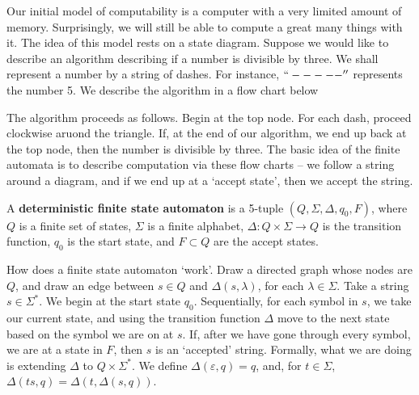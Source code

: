 Our initial model of computability is a computer with a very limited amount of memory. Surprisingly, we will still be able to compute a great many things with it. The idea of this model rests on a state diagram. Suppose we would like to describe an algorithm describing if a number is divisible by three. We shall represent a number by a string of dashes. For instance, $``-----''$ represents the number 5. We describe the algorithm in a flow chart below
%
\begin{center}
\end{center}
%
The algorithm proceeds as follows. Begin at the top node. For each dash, proceed clockwise aruond the triangle. If, at the end of our algorithm, we end up back at the top node, then the number is divisible by three. The basic idea of the finite automata is to describe computation via these flow charts -- we follow a string around a diagram, and if we end up at a `accept state', then we accept the string.

\begin{definition}
    A {\bf deterministic finite state automaton} is a 5-tuple $(Q, \Sigma, \Delta, q_0, F)$, where $Q$ is a finite set of states, $\Sigma$ is a finite alphabet, $\Delta: Q \times \Sigma \to Q$ is the transition function, $q_0$ is the start state, and $F \subset Q$ are the accept states.
\end{definition}

How does a finite state automaton `work'. Draw a directed graph whose nodes are $Q$, and draw an edge between $s \in Q$ and $\Delta(s, \lambda)$, for each $\lambda \in \Sigma$. Take a string $s \in \Sigma^*$. We begin at the start state $q_0$. Sequentially, for each symbol in $s$, we take our current state, and using the transition function $\Delta$ move to the next state based on the symbol we are on at $s$. If, after we have gone through every symbol, we are at a state in $F$, then $s$ is an `accepted' string. Formally, what we are doing is extending $\Delta$ to $Q \times \Sigma^*$. We define $\Delta(\varepsilon, q) = q$, and, for $t \in \Sigma$, $\Delta(ts, q) = \Delta(t,\Delta(s,q))$.

